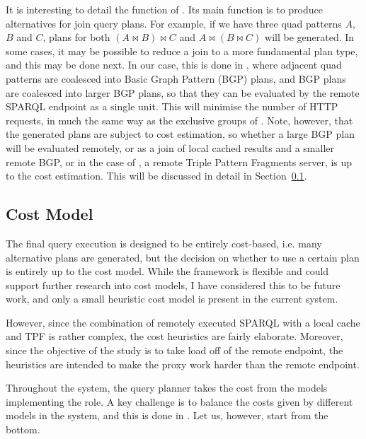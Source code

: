 It is interesting to detail the function of
. Its main function is to
produce alternatives for join query plans. For example, if we have
three quad patterns $A$, $B$ and $C$, plans for both $ ( A \bowtie B)
\bowtie C $ and $ A \bowtie ( B \bowtie C ) $ will be generated. In
some cases, it may be possible to reduce a join to a more fundamental
plan type, and this may be done next. In our case, this is done in
, where adjacent quad patterns
are coalesced into Basic Graph Pattern (BGP) plans, and BGP plans are
coalesced into larger BGP plans, so that they can be evaluated by the
remote SPARQL endpoint as a single unit. This will minimise the number
of HTTP requests, in much the same way as the exclusive groups of
\cite{springerlink:10.1007/978-3-642-25073-6-38}. Note, however, that
the generated plans are subject to cost estimation, so whether a large
BGP plan will be evaluated remotely, or as a join of local cached
results and a smaller remote BGP, or in the case of
, a remote Triple Pattern
Fragments server, is up to the cost estimation. This will be discussed
in detail in Section~\ref{sec:costheuristics}.

\subsection{Cost Model}\label{sec:costheuristics}

The final query execution is designed to be entirely cost-based,
i.e. many alternative plans are generated, but the decision on whether
to use a certain plan is entirely up to the cost model. While the
framework is flexible and could support further research into cost
models, I have considered this to be future work, and only a small
heuristic cost model is present in the current system. 

However, since the combination of remotely executed SPARQL with a
local cache and TPF is rather complex, the cost
heuristics are fairly elaborate. Moreover, since the objective of the
study is to take load off of the remote endpoint, the heuristics are
intended to make the proxy work harder than the remote endpoint.

Throughout the system, the query planner takes the cost from the
models implementing the  role. A
key challenge is to balance the costs given by different models in the
system, and this is done in
. Let us, however, start
from the bottom. 

